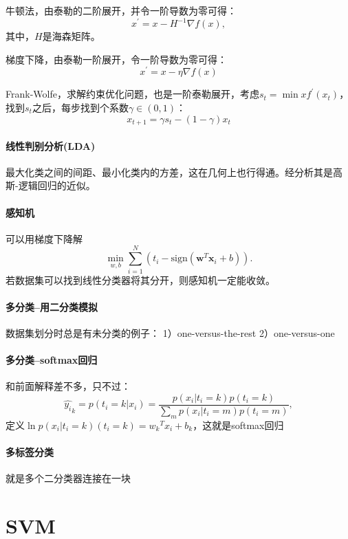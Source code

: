 牛顿法，由泰勒的二阶展开，并令一阶导数为零可得：
$$x^{\prime} = x - H^{-1}\nabla f(x),$$
其中，$H$是海森矩阵。

梯度下降，由泰勒一阶展开，令一阶导数为零可得：
$$x^{\prime} = x -\eta\nabla{}f(x)$$

Frank-Wolfe，求解约束优化问题，也是一阶泰勒展开，考虑$s_t = \min xf^\prime(x_t)$，找到$s_t$之后，每步找到个系数$\gamma \in (0,1)$：
$$x_{t+1} = \gamma s_t - (1-\gamma)x_t$$

\paragraph{线性判别分析(LDA)} 最大化类之间的间距、最小化类内的方差，这在几何上也行得通。经分析其是高斯-逻辑回归的近似。

\paragraph{感知机} 可以用梯度下降解
$$\min_{w,b} \sum_{i=1}^N (t_i - \mathrm{sign}(\bm w^T\bm x_i + b)).$$
若数据集可以找到线性分类器将其分开，则感知机一定能收敛。

\paragraph{多分类--用二分类模拟}数据集划分时总是有未分类的例子：
1）one-versus-the-rest
2）one-versus-one


\paragraph{多分类--softmax回归} 
和前面解释差不多，只不过：
$$\hat{y_i}_k = p(t_i = k|x_i) = \frac{p(x_i|t_i = k)p(t_i = k)}{\sum_m p(x_i|t_i = m)p(t_i = m)},$$
定义$\ln p(x_i|t_i = k)(t_i = k) = {w_k}^Tx_i + b_k$，这就是softmax回归

\paragraph{多标签分类} 就是多个二分类器连接在一块

\section{SVM}
